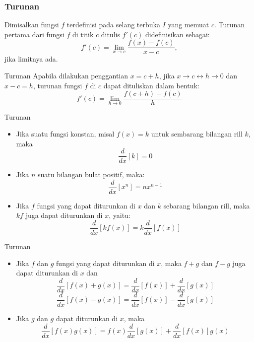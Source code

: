 \documentclass[pdflatex,compress,mathserif]{beamer}
\begin{document}
	\begin{frame}
		\frametitle{Turunan}
		Dimisalkan fungsi $ f $ terdefinisi pada selang terbuka $ I $ yang memuat $ c $. Turunan pertama dari fungsi $ f $ di titik $ c $ ditulis $ f'(c) $ didefinisikan sebagai:
		\begin{equation}
			f'(c) = \lim\limits_{x \rightarrow c} \frac{f(x) - f(c)}{x - c} ,
		\end{equation}
		jika limitnya ada.
	\end{frame}

	\begin{frame}{Turunan}
		Apabila dilakukan penggantian $ x = c + h $, jika $ x \rightarrow c \leftrightarrow h \rightarrow 0 $ dan $ x - c = h $, turunan fungsi $ f $ di $ c $ dapat dituliskan dalam bentuk:
		\begin{equation}
			f'(c) = \lim\limits_{h \rightarrow 0} \frac{f(c + h) - f(c)}{h}
		\end{equation}
	\end{frame}

	
	\begin{frame}{Turunan}
		\begin{itemize}
			\item Jika suatu fungsi konstan, misal $ f(x) = k $ untuk sembarang bilangan rill $ k $, maka
			\begin{equation}
				\frac{d}{dx}[k] = 0
			\end{equation}
			\item Jika $ n $ suatu bilangan bulat positif, maka:
			\begin{equation}
				\frac{d}{dx}[x^n] = n x^{n-1}
			\end{equation}
			\item Jika $ f $ fungsi yang dapat diturunkan di $ x $ dan $ k $ sebarang bilangan rill, maka $ kf $ juga dapat diturunkan di $ x $, yaitu:
			\begin{equation}
				\frac{d}{dx}[kf(x)] = k\frac{d}{dx}[f(x)]
			\end{equation}
		\end{itemize}
	\end{frame}

	\begin{frame}{Turunan}
		\begin{itemize}
			\item Jika $ f $ dan $ g $ fungsi yang dapat diturunkan di $ x $, maka $ f + g $ dan $ f - g $ juga dapat diturunkan di $ x $ dan
			\begin{equation}
				\frac{d}{dx}[f(x) + g(x)] = \frac{d}{dx}[f(x)] + \frac{d}{dx}[g(x)]
			\end{equation}
			\begin{equation}
				\frac{d}{dx}[f(x) - g(x)] = \frac{d}{dx}[f(x)] - \frac{d}{dx}[g(x)]
			\end{equation}
			\item Jika $ g $ dan $ g $ dapat diturunkan di $ x $, maka
			\begin{equation}
				\frac{d}{dx}[f(x)g(x)] = f(x)\frac{d}{dx}[g(x)] + \frac{d}{dx}[f(x)]g(x)
			\end{equation}
		\end{itemize}
	\end{frame}
	
\end{document}

